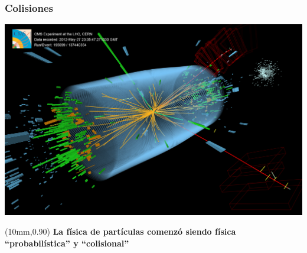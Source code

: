 \documentclass[xetex,mathserif,serif,10pt]{beamer}
\begin{document}
\begin{frame}
  \frametitle{Colisiones}
  {\centering \includegraphics[width=1.00\columnwidth]{./figs/u01/higgs.png}}
  \begin{textblock*}{110mm}(10mm,0.90\textheight)
    {\bf{\alert{La física de partículas comenzó siendo física ``probabilística'' y ``colisional''}}}
  \end{textblock*}
\end{frame}
\end{document}
